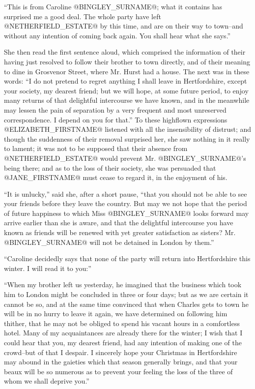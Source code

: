 ``This is from Caroline @BINGLEY_SURNAME@; what it contains has surprised me a good
deal. The whole party have left @NETHERFIELD_ESTATE@ by this time, and are on
their way to town--and without any intention of coming back again. You
shall hear what she says.''

She then read the first sentence aloud, which comprised the information
of their having just resolved to follow their brother to town directly,
and of their meaning to dine in Grosvenor Street, where Mr. Hurst had a
house. The next was in these words: ``I do not pretend to regret anything
I shall leave in Hertfordshire, except your society, my dearest friend;
but we will hope, at some future period, to enjoy many returns of that
delightful intercourse we have known, and in the meanwhile may
lessen the pain of separation by a very frequent and most unreserved
correspondence. I depend on you for that.'' To these highflown
expressions @ELIZABETH_FIRSTNAME@ listened with all the insensibility of distrust;
and though the suddenness of their removal surprised her, she saw
nothing in it really to lament; it was not to be supposed that their
absence from @NETHERFIELD_ESTATE@ would prevent Mr. @BINGLEY_SURNAME@'s being there; and as
to the loss of their society, she was persuaded that @JANE_FIRSTNAME@ must cease to
regard it, in the enjoyment of his.

``It is unlucky,'' said she, after a short pause, ``that you should not be
able to see your friends before they leave the country. But may we not
hope that the period of future happiness to which Miss @BINGLEY_SURNAME@ looks
forward may arrive earlier than she is aware, and that the delightful
intercourse you have known as friends will be renewed with yet greater
satisfaction as sisters? Mr. @BINGLEY_SURNAME@ will not be detained in London by
them.''

``Caroline decidedly says that none of the party will return into
Hertfordshire this winter. I will read it to you:''

``When my brother left us yesterday, he imagined that the business which
took him to London might be concluded in three or four days; but as we
are certain it cannot be so, and at the same time convinced that when
Charles gets to town he will be in no hurry to leave it again, we have
determined on following him thither, that he may not be obliged to spend
his vacant hours in a comfortless hotel. Many of my acquaintances are
already there for the winter; I wish that I could hear that you, my
dearest friend, had any intention of making one of the crowd--but of
that I despair. I sincerely hope your Christmas in Hertfordshire may
abound in the gaieties which that season generally brings, and that your
beaux will be so numerous as to prevent your feeling the loss of the
three of whom we shall deprive you.''

